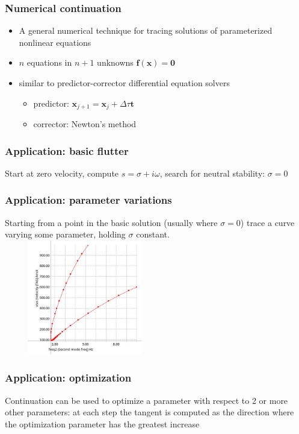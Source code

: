 \documentclass{beamer}
\newcommand{\Vector}[1]{\boldsymbol{#1}}
\begin{document}
\begin{frame}
	\frametitle{Numerical continuation}
	\begin{itemize}
		\item A general numerical technique for tracing solutions of parameterized nonlinear equations
		\item $n$ equations in $n+1$ unknowns $\Vector{f}(\Vector{x}) = \Vector{0}$
		\item similar to predictor-corrector differential equation solvers
		\begin{itemize}
			\item predictor: $\Vector{x}_{j+1} = \Vector{x}_j + \Delta \tau \Vector{t}$
			\item corrector: Newton's method
		\end{itemize}
	\end{itemize}
\end{frame}

\begin{frame}
	\frametitle{Application: basic flutter}
	Start at zero velocity, compute $s = \sigma + i\omega$, search for
	neutral stability: $\sigma = 0$
\end{frame}

\begin{frame}
	\frametitle{Application: parameter variations}
	Starting from a point in the basic solution (usually where $\sigma=0$)
	trace a curve varying some parameter, holding $\sigma$ constant.
		\includegraphics[height=5cm,width=7cm]{freq2.jpg}
\end{frame}

\begin{frame}
	\frametitle{Application: optimization}
	Continuation can be used to optimize a parameter with respect to
	2 or more other parameters: at each step the tangent is computed as
	the direction where the optimization parameter has the greatest increase
\end{frame}
\end{document}
